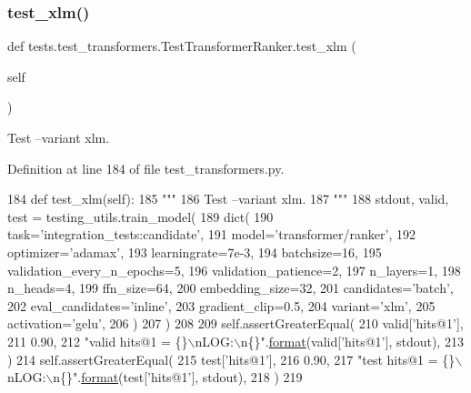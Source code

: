 \subsubsection{\texorpdfstring{test\+\_\+xlm()}{test\_xlm()}}
{\footnotesize\ttfamily def tests.\+test\+\_\+transformers.\+Test\+Transformer\+Ranker.\+test\+\_\+xlm (\begin{DoxyParamCaption}\item[{}]{self }\end{DoxyParamCaption})}

\begin{DoxyVerb}Test --variant xlm.
\end{DoxyVerb}
 

Definition at line 184 of file test\+\_\+transformers.\+py.


\begin{DoxyCode}
184     \textcolor{keyword}{def }test\_xlm(self):
185         \textcolor{stringliteral}{"""}
186 \textcolor{stringliteral}{        Test --variant xlm.}
187 \textcolor{stringliteral}{        """}
188         stdout, valid, test = testing\_utils.train\_model(
189             dict(
190                 task=\textcolor{stringliteral}{'integration\_tests:candidate'},
191                 model=\textcolor{stringliteral}{'transformer/ranker'},
192                 optimizer=\textcolor{stringliteral}{'adamax'},
193                 learningrate=7e-3,
194                 batchsize=16,
195                 validation\_every\_n\_epochs=5,
196                 validation\_patience=2,
197                 n\_layers=1,
198                 n\_heads=4,
199                 ffn\_size=64,
200                 embedding\_size=32,
201                 candidates=\textcolor{stringliteral}{'batch'},
202                 eval\_candidates=\textcolor{stringliteral}{'inline'},
203                 gradient\_clip=0.5,
204                 variant=\textcolor{stringliteral}{'xlm'},
205                 activation=\textcolor{stringliteral}{'gelu'},
206             )
207         )
208 
209         self.assertGreaterEqual(
210             valid[\textcolor{stringliteral}{'hits@1'}],
211             0.90,
212             \textcolor{stringliteral}{"valid hits@1 = \{\}\(\backslash\)nLOG:\(\backslash\)n\{\}"}.\hyperlink{namespaceparlai_1_1chat__service_1_1services_1_1messenger_1_1shared__utils_a32e2e2022b824fbaf80c747160b52a76}{format}(valid[\textcolor{stringliteral}{'hits@1'}], stdout),
213         )
214         self.assertGreaterEqual(
215             test[\textcolor{stringliteral}{'hits@1'}],
216             0.90,
217             \textcolor{stringliteral}{"test hits@1 = \{\}\(\backslash\)nLOG:\(\backslash\)n\{\}"}.\hyperlink{namespaceparlai_1_1chat__service_1_1services_1_1messenger_1_1shared__utils_a32e2e2022b824fbaf80c747160b52a76}{format}(test[\textcolor{stringliteral}{'hits@1'}], stdout),
218         )
219 
\end{DoxyCode}


